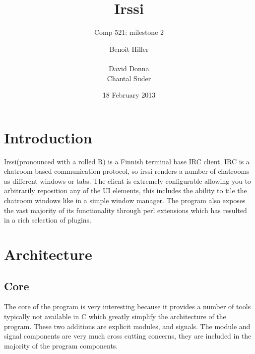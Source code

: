 \documentclass{acm_proc_article-sp}
\begin{document}
\title{Irssi}
\subtitle{Comp 521: milestone 2}

\author{
\alignauthor
Benoit Hiller\\
       \\       
\alignauthor
David Donna\\
\alignauthor
Chantal Suder
}

\date{18 February 2013}
\maketitle




\section{Introduction}
Irssi(pronounced with a rolled R) is a Finnish terminal base IRC client. IRC is a chatroom based communication protocol, so irssi renders a number of chatrooms as different windows or tabs. The client is extremely configurable allowing you to arbitrarily reposition any of the UI elements, this includes the ability to tile the chatroom windows like in a simple window manager. The program also exposes the vast majority of its functionality through perl extensions which has resulted in a rich selection of plugins.

\section{Architecture}
\subsection{Core}
The core of the program is very interesting because it provides a number of tools typically not available in C which greatly simplify the architecture of the program. These two additions are explicit modules, and signals. The module and signal components are very much cross cutting concerns, they are included in the majority of the program components.
\end{document}
